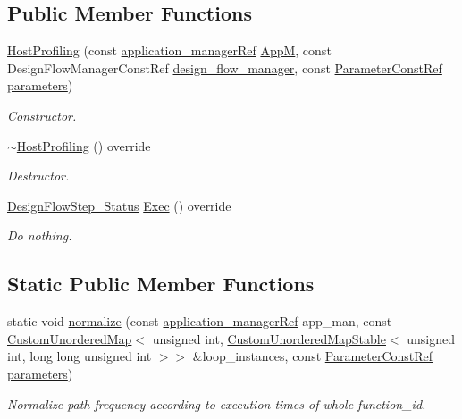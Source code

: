 \subsection*{Public Member Functions}
\begin{DoxyCompactItemize}
\item 
\hyperlink{classHostProfiling_a20f6b7dda2087eb8b6970420ac4447eb}{Host\+Profiling} (const \hyperlink{application__manager_8hpp_a04ccad4e5ee401e8934306672082c180}{application\+\_\+manager\+Ref} \hyperlink{classFrontendFlowStep_a0ac0d8db2a378416583f51c4faa59d15}{AppM}, const Design\+Flow\+Manager\+Const\+Ref \hyperlink{classDesignFlowStep_ab770677ddf087613add30024e16a5554}{design\+\_\+flow\+\_\+manager}, const \hyperlink{Parameter_8hpp_a37841774a6fcb479b597fdf8955eb4ea}{Parameter\+Const\+Ref} \hyperlink{classDesignFlowStep_a802eaafe8013df706370679d1a436949}{parameters})
\begin{DoxyCompactList}\small\item\em Constructor. \end{DoxyCompactList}\item 
\hyperlink{classHostProfiling_a04be7f9aeec2597dcb633d2728401c30}{$\sim$\+Host\+Profiling} () override
\begin{DoxyCompactList}\small\item\em Destructor. \end{DoxyCompactList}\item 
\hyperlink{design__flow__step_8hpp_afb1f0d73069c26076b8d31dbc8ebecdf}{Design\+Flow\+Step\+\_\+\+Status} \hyperlink{classHostProfiling_a9cf2a3820514e3a207c5e975a25f7d04}{Exec} () override
\begin{DoxyCompactList}\small\item\em Do nothing. \end{DoxyCompactList}\end{DoxyCompactItemize}
\subsection*{Static Public Member Functions}
\begin{DoxyCompactItemize}
\item 
static void \hyperlink{classHostProfiling_a30ab116b6cc45fd0f8eb3eeabfcb3f17}{normalize} (const \hyperlink{application__manager_8hpp_a04ccad4e5ee401e8934306672082c180}{application\+\_\+manager\+Ref} app\+\_\+man, const \hyperlink{custom__map_8hpp_ad1ed68f2ff093683ab1a33522b144adc}{Custom\+Unordered\+Map}$<$ unsigned int, \hyperlink{custom__map_8hpp_a7314a7df1cdb3a3acf478ab86e95c226}{Custom\+Unordered\+Map\+Stable}$<$ unsigned int, long long unsigned int $>$$>$ \&loop\+\_\+instances, const \hyperlink{Parameter_8hpp_a37841774a6fcb479b597fdf8955eb4ea}{Parameter\+Const\+Ref} \hyperlink{classDesignFlowStep_a802eaafe8013df706370679d1a436949}{parameters})
\begin{DoxyCompactList}\small\item\em Normalize path frequency according to execution times of whole function\+\_\+id. \end{DoxyCompactList}\end{DoxyCompactItemize}

